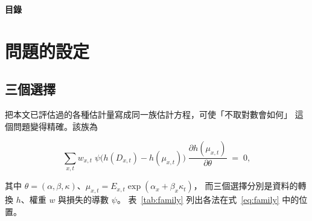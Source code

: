 \documentclass[UTF8, fontset=macnew, a4paper, 12pt]{ctexart}
\begin{document}
\clearpage
{\bfseries 目\quad 錄}\par\vspace{8pt}
\makeatletter{}\makeatother

\clearpage
{}

\section{問題的設定}\label{sec:setup}

\subsection{三個選擇}\label{subsec:three}

把本文已評估過的各種估計量寫成同一族估計方程，可使「不取對數會如何」
這個問題變得精確。該族為

\begin{equation}\label{eq:family}
\sum_{x,t} w_{x,t}\;
\psi\!\big(h(D_{x,t})-h(\mu_{x,t})\big)\;
\frac{\partial h(\mu_{x,t})}{\partial\theta}\;=\;0 ,
\end{equation}

其中 $\theta=(\alpha,\beta,\kappa)$、$\mu_{x,t}=E_{x,t}\exp(\alpha_x+\beta_x\kappa_t)$，
而三個選擇分別是資料的轉換 $h$、權重 $w$ 與損失的導數 $\psi$。
表~\ref{tab:family} 列出各法在式~\eqref{eq:family} 中的位置。
\end{document}
